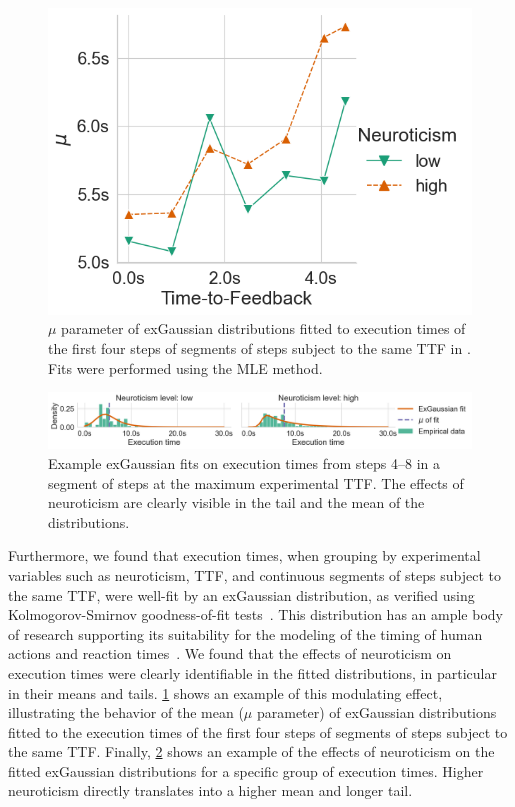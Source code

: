 \begin{figure}
    \centering
    \includegraphics[width=\columnwidth]{figs/new_model/mu_fits_exgaussian_slice0.png}
    \caption{%
        \( \mu \) parameter of \acs*{exGaussian} distributions fitted to execution times of the first four steps of segments of steps subject to the same \ac{TTF} in \textcite{olguinmunoz:impact2021}.
        Fits were performed using the \ac{MLE} method.
    }\label{fig:muexgaussian}
\end{figure}

\begin{figure}
    \centering
    \includegraphics[width=\textwidth]{figs/new_model/dist_fits_neuro.png}
    \caption{%
        Example \ac{exGaussian} fits on execution times from steps \numrange{4}{8} in a segment of steps at the maximum experimental \ac{TTF}.
        The effects of neuroticism are clearly visible in the tail and the mean of the distributions.
    }\label{fig:fitsneuro}
\end{figure}

Furthermore, we found that execution times, when grouping by experimental variables such as neuroticism, \ac{TTF}, and continuous segments of steps subject to the same \ac{TTF}, were well-fit by an \ac{exGaussian} distribution, as verified using Kolmogorov-Smirnov goodness-of-fit tests~\cite{massey1951kolmogorov}.
This distribution has an ample body of research supporting its suitability for the modeling of the timing of human actions and reaction times~\cite{Rohrer1994analysis,Palmer2011shapes,Marmolejo2022generalised}.
We found that the effects of neuroticism on execution times were clearly identifiable in the fitted distributions, in particular in their means and tails.
\cref{fig:muexgaussian} shows an example of this modulating effect, illustrating the behavior of the mean (\( \mu \) parameter) of \ac{exGaussian} distributions fitted to the execution times of the first four steps of segments of steps subject to the same \ac{TTF}.
Finally, \cref{fig:fitsneuro} shows an example of the effects of neuroticism on the fitted \ac{exGaussian} distributions for a specific group of execution times.
Higher neuroticism directly translates into a higher mean and longer tail.